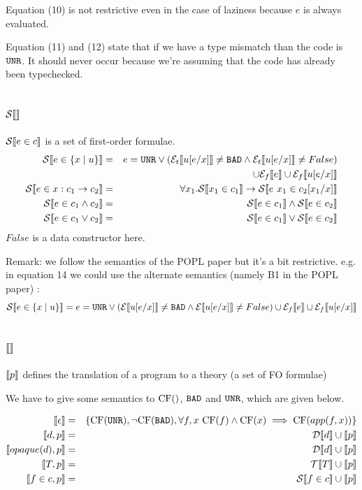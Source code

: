 \documentclass{article}
\begin{document}
Equation (10) is not restrictive even in the case of laziness because $e$ is always evaluated.

Equation (11) and (12) state that if we have a type mismatch than the code is $\unr$. It should never occur because we're assuming that the code has already been typechecked.


\subsection{$\strans{}$}
$\strans{e \in c}$ is a set of first-order formulae.
\begin{eqnarray}
\strans{e \in \{x \mid u \}} &=& e = \unr \lor (\etranst{u[e/x]} \neq \bad \land \etranst{u[e/x]} \neq False)\\
&& \cup \etransf{e} \cup \etransf{u[e/x]}\\
\strans{e \in x:c_1 \to c_2}  &=& \forall x_1. \strans{x_1 \in c_1} \to \strans{e~x_1 \in c_2[x_1/x]}\\
\strans{e \in c_1 \land c_2} &=& \strans{e \in c_1} \land \strans{e \in c_2}\\
\strans{e \in c_1 \lor c_2} &=& \strans{e \in c_1} \lor \strans{e \in c_2}\\
\end{eqnarray}
$False$ is a data constructor here.

Remark: we follow the semantics of the POPL paper but it's a bit restrictive.
e.g. in equation 14 we could use the alternate semantics (namely B1 in the POPL paper) : 
$$\strans{e \in \{x \mid u \}} = e = \unr \lor (\etrans{u[e/x]} \neq \bad \land \etrans{u[e/x]} \neq False) \cup \etransf{e} \cup \etransf{u[e/x]}$$

\subsection{$\trans{}$}
$\trans{p}$ defines the translation of a program to a theory (a set of FO formulae)

We have to give some semantics to $\cf{}$, $\bad$ and $\unr$, which are given below.

\begin{eqnarray}
\trans{\epsilon} &=& \{ \cf{\unr}, \lnot \cf{\bad}, \forall f,x~\cf{f} \land \cf{x} \implies \cf{app(f,x)} \}\\
\trans{d,p} &=& \dtrans{d} \cup \trans{p}\\
\trans{opaque(d),p} &=& \dtrans{d} \cup \trans{p}\\
\trans{T,p} &=& \ttrans{T} \cup \trans{p}\\
\trans{f \in c,p} &=& \strans{f \in c} \cup \trans{p}\\
\end{eqnarray}
\end{document}
